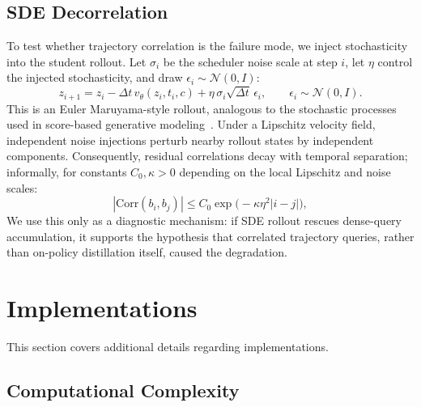 \documentclass{llmxive}
\begin{document}
\vspace{0.2cm}


\subsection{SDE Decorrelation}
\label{app:sde-decorrelation}

To test whether trajectory correlation is the failure mode, we inject stochasticity into the student rollout. Let $\sigma_i$ be the scheduler noise scale at step $i$, let $\eta$ control the injected stochasticity, and draw $\epsilon_i\sim\mathcal{N}(0,I)$:
\begin{equation}
  z_{i+1}=z_i-\Delta t\,v_\theta(z_i,t_i,c)+\eta\,\sigma_i\sqrt{\Delta t}\,\epsilon_i,
  \qquad \epsilon_i\sim\mathcal{N}(0,I).
  \label{eq:app-sde-rollout}
\end{equation}
This is an Euler Maruyama-style rollout, analogous to the stochastic processes used in score-based generative modeling~\cite{song2020score}. Under a Lipschitz velocity field, independent noise injections perturb nearby rollout states by independent components. Consequently, residual correlations decay with temporal separation; informally, for constants $C_0,\kappa>0$ depending on the local Lipschitz and noise scales:
\begin{equation}
  \left|\mathrm{Corr}(b_i,b_j)\right|
  \le C_0\exp\bigl(-\kappa\eta^2 |i-j|\bigr),
  \label{eq:app-corr-decay}
\end{equation}
We use this only as a diagnostic mechanism: if SDE rollout rescues dense-query accumulation, it supports the hypothesis that correlated trajectory queries, rather than on-policy distillation itself, caused the degradation.


\vspace{0.2cm}


\section{Implementations}
This section covers additional details regarding implementations.


\vspace{0.2cm}


\subsection{Computational Complexity}
\label{app:compute-complexity}
\end{document}
